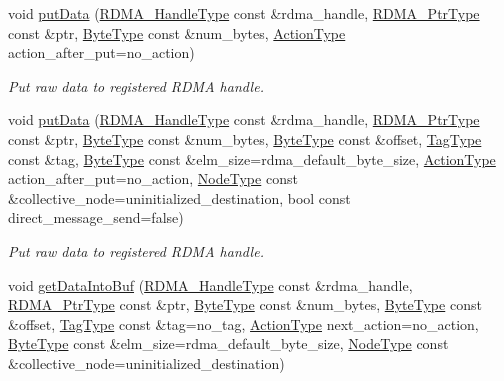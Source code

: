 \begin{DoxyCompactItemize}
void \hyperlink{structvt_1_1rdma_1_1_r_d_m_a_manager_a651ca7aaa9fdbf404c41157b883407e2}{put\+Data} (\hyperlink{namespacevt_a10442579ec4e7ebef223818e64bcf908}{R\+D\+M\+A\+\_\+\+Handle\+Type} const \&rdma\+\_\+handle, \hyperlink{namespacevt_a9e2c953286c7616f7c218e9951790776}{R\+D\+M\+A\+\_\+\+Ptr\+Type} const \&ptr, \hyperlink{namespacevt_aab8d55968084610ce3b17057981e9300}{Byte\+Type} const \&num\+\_\+bytes, \hyperlink{namespacevt_ae0a5a7b18cc99d7b732cb4d44f46b0f3}{Action\+Type} action\+\_\+after\+\_\+put=no\+\_\+action)
\begin{DoxyCompactList}\small\item\em Put raw data to registered R\+D\+MA handle. \end{DoxyCompactList}\item 
void \hyperlink{structvt_1_1rdma_1_1_r_d_m_a_manager_a839c0031a48c5341494b119b0f10bafa}{put\+Data} (\hyperlink{namespacevt_a10442579ec4e7ebef223818e64bcf908}{R\+D\+M\+A\+\_\+\+Handle\+Type} const \&rdma\+\_\+handle, \hyperlink{namespacevt_a9e2c953286c7616f7c218e9951790776}{R\+D\+M\+A\+\_\+\+Ptr\+Type} const \&ptr, \hyperlink{namespacevt_aab8d55968084610ce3b17057981e9300}{Byte\+Type} const \&num\+\_\+bytes, \hyperlink{namespacevt_aab8d55968084610ce3b17057981e9300}{Byte\+Type} const \&offset, \hyperlink{namespacevt_a84ab281dae04a52a4b243d6bf62d0e52}{Tag\+Type} const \&tag, \hyperlink{namespacevt_aab8d55968084610ce3b17057981e9300}{Byte\+Type} const \&elm\+\_\+size=rdma\+\_\+default\+\_\+byte\+\_\+size, \hyperlink{namespacevt_ae0a5a7b18cc99d7b732cb4d44f46b0f3}{Action\+Type} action\+\_\+after\+\_\+put=no\+\_\+action, \hyperlink{namespacevt_a866da9d0efc19c0a1ce79e9e492f47e2}{Node\+Type} const \&collective\+\_\+node=uninitialized\+\_\+destination, bool const direct\+\_\+message\+\_\+send=false)
\begin{DoxyCompactList}\small\item\em Put raw data to registered R\+D\+MA handle. \end{DoxyCompactList}\item 
void \hyperlink{structvt_1_1rdma_1_1_r_d_m_a_manager_aa97aeb2fee7d1a1b2228ff063d64eb5f}{get\+Data\+Into\+Buf} (\hyperlink{namespacevt_a10442579ec4e7ebef223818e64bcf908}{R\+D\+M\+A\+\_\+\+Handle\+Type} const \&rdma\+\_\+handle, \hyperlink{namespacevt_a9e2c953286c7616f7c218e9951790776}{R\+D\+M\+A\+\_\+\+Ptr\+Type} const \&ptr, \hyperlink{namespacevt_aab8d55968084610ce3b17057981e9300}{Byte\+Type} const \&num\+\_\+bytes, \hyperlink{namespacevt_aab8d55968084610ce3b17057981e9300}{Byte\+Type} const \&offset, \hyperlink{namespacevt_a84ab281dae04a52a4b243d6bf62d0e52}{Tag\+Type} const \&tag=no\+\_\+tag, \hyperlink{namespacevt_ae0a5a7b18cc99d7b732cb4d44f46b0f3}{Action\+Type} next\+\_\+action=no\+\_\+action, \hyperlink{namespacevt_aab8d55968084610ce3b17057981e9300}{Byte\+Type} const \&elm\+\_\+size=rdma\+\_\+default\+\_\+byte\+\_\+size, \hyperlink{namespacevt_a866da9d0efc19c0a1ce79e9e492f47e2}{Node\+Type} const \&collective\+\_\+node=uninitialized\+\_\+destination)

\end{DoxyCompactItemize}
